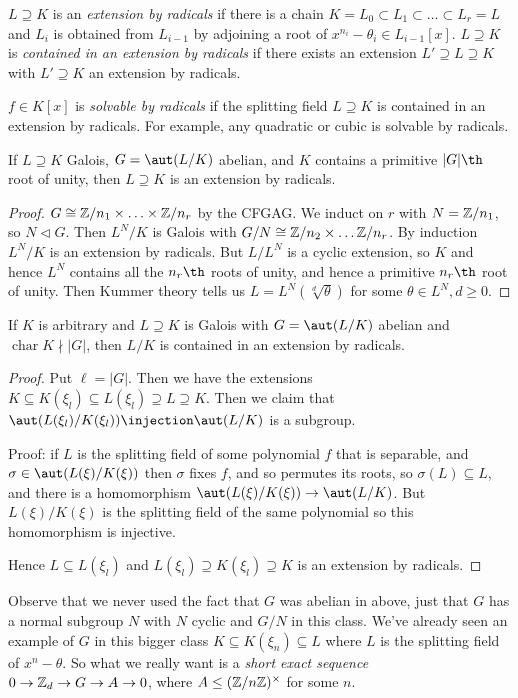 \documentclass[a4paper, 10pt, twocolumn]{amsart}
\renewcommand{\charr}{\operatorname{char}}
\begin{document}
$L\supseteq K$ is an \emph{extension by radicals} if there is a chain $K = L_0 \subset L_1 \subset \ldots \subset L_r = L$ and $L_i$ is obtained from $L_{i-1}$ by adjoining a root of $x^{n_i} - \theta_i \in L_{i-1}[x]$. $L \supseteq K$ is \emph{contained in an extension by radicals} if there exists an extension $L' \supseteq L \supseteq K$ with $L'\supseteq K$ an extension by radicals.

$f \in K[x]$ is \emph{solvable by radicals} if the splitting field $L \supseteq K$ is contained in an extension by radicals. For example, any quadratic or cubic is solvable by radicals.

\begin{lemma}
If $L \supseteq K$ Galois, $G = \aut(L/K)$ abelian, and $K$ contains a primitive $|G|\th$ root of unity, then $L \supseteq K$ is an extension by radicals.
\end{lemma}
\begin{proof}
$G \cong \mathbb{Z}/n_1 \times \ldots \times \mathbb{Z}/n_r$ by the CFGAG. We induct on $r$ with $N = \mathbb{Z}/n_1$, so $N \triangleleft G$. Then $L^N/K$ is Galois with $G/N \cong \mathbb{Z}/n_2 \times \ldots \mathbb{Z}/n_r$. By induction $L^N/K$ is an extension by radicals. But $L/L^N$ is a cyclic extension, so $K$ and hence $L^N$ contains all the $n_r\th$ roots of unity, and hence a primitive $n_r\th$ root of unity. Then Kummer theory tells us $L = L^N(\sqrt[d]{\theta})$ for some $\theta \in L^N, d \geq 0$.
\end{proof}

\begin{corollary}
If $K$ is arbitrary and $L \supseteq K$ is Galois with $G = \aut(L/K)$ abelian and $\charr K \nmid |G|$, then $L/K$ is contained in an extension by radicals.
\end{corollary}
\begin{proof}
Put $\ell = |G|$. Then we have the extensions $K \subseteq K(\xi_l) \subseteq L(\xi_l) \supseteq L \supseteq K$. Then we claim that $\aut(L(\xi_l)/K(\xi_l)) \injection \aut(L/K)$ is a subgroup.

Proof: if $L$ is the splitting field of some polynomial $f$ that is separable, and $\sigma \in \aut(L(\xi)/K(\xi))$ then $\sigma$ fixes $f$, and so permutes its roots, so $\sigma(L)\subseteq L$, and there is a homomorphism $\aut(L(\xi)/K(\xi)) \to \aut(L/K)$. But $L(\xi)/K(\xi)$ is the splitting field of the same polynomial so this homomorphism is injective.

Hence $L \subseteq L(\xi_l)$ and $L(\xi_l) \supseteq K(\xi_l) \supseteq K$ is an extension by radicals.
\end{proof}
Observe that we never used the fact that $G$ was abelian in above, just that $G$ has a normal subgroup $N$ with $N$ cyclic and $G/N$ in this class. We've already seen an example of $G$ in this bigger class $K \subseteq K(\xi_n) \subseteq L$ where $L$ is the splitting field of $x^n-\theta$. So what we really want is a \emph{short exact sequence} $0 \to \mathbb{Z}_d \to G \to A \to 0$, where $A \leq (\mathbb{Z}/n\mathbb{Z})^{\times}$ for some $n$.
\end{document}
